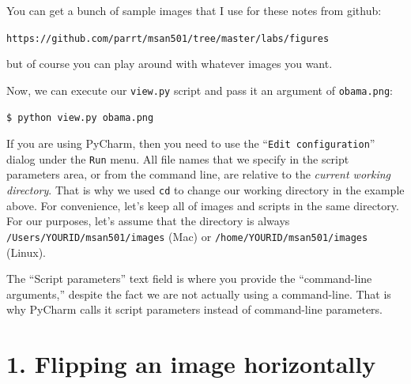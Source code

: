 You can get a bunch of sample images that I use for these notes from github:

{\tt https://github.com/parrt/msan501/tree/master/labs/figures}

\noindent but of course you can play around with whatever images you want.

\noindent Now, we can execute our {\tt view.py} script and pass it an argument of {\tt obama.png}:

\begin{lstlisting}[style=BashInputStyle]
$ python view.py obama.png
\end{lstlisting}

If you are using PyCharm, then you need to use the ``{\tt\small Edit configuration}'' dialog under the {\tt Run} menu.  All file names that we specify in the script parameters area, or from the command line, are relative to the {\em current working directory}. That is why we used {\tt cd} to change our working directory in the example above. For convenience, let's keep all of images and scripts in the same directory. For our purposes, let's assume that the directory is always {\tt\small /Users/YOURID/msan501/images} (Mac) or {\tt\small /home/YOURID/msan501/images} (Linux).


The ``Script parameters'' text field is where you provide the ``command-line arguments,'' despite the fact we are not actually using a command-line. That is why PyCharm calls it script parameters instead of command-line parameters.

\section{1. Flipping an image horizontally}

